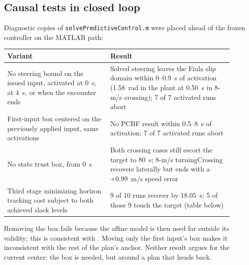 \documentclass[11pt]{article}
\begin{document}
\subsection{Causal tests in closed loop}
Diagnostic copies of \texttt{solvePredictiveControl.m} were placed ahead of the
frozen controller on the MATLAB path:
\begin{center}\footnotesize
\begin{tabular}{p{0.42\linewidth}p{0.5\linewidth}}
\toprule
Variant & Result\\
\midrule
No steering bound on the issued input, activated at 0~s, at 4~s, or when the
encounter ends &
Solved steering leaves the Fiala slip domain within 0--0.9~s of activation
(1.58~rad in the plant at 0.50~s in 8-m/s crossing); 7 of 7 activated runs abort\\
First-input box centered on the previously applied input, same activations &
No PCBF result within 0.5--8~s of activation; 7 of 7 activated runs abort\\
No state trust box, from 0~s &
Both crossing cases still escort the target to 80~s; 8-m/s turningCrossing
recovers laterally but ends with a $+0.99$~m/s speed error\\
Third stage minimizing horizon tracking cost subject to both achieved slack levels &
9 of 10 runs recover by 18.05~s; 5 of those 9 touch the target (table below)\\
\bottomrule
\end{tabular}\end{center}
Removing the box fails because the affine model is then used far outside its
validity; this is consistent with .
Moving only the first input's box makes it inconsistent with the rest of the
plan's anchor. Neither result argues for the current center: the box is needed,
but around a plan that heads back.
\end{document}
